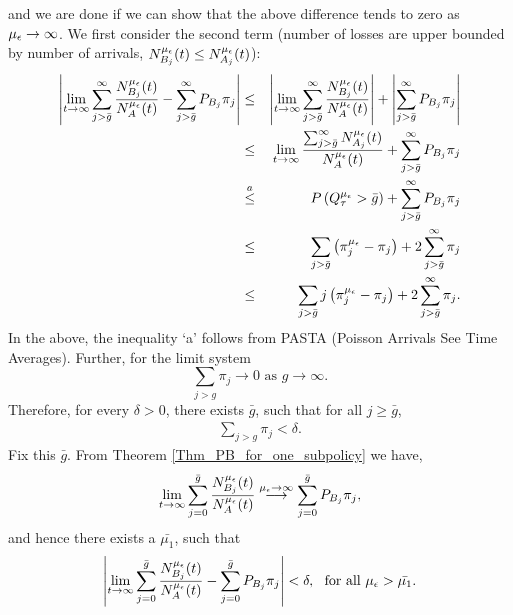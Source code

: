 	and we are done if we can show that the above difference tends to zero as $\mu_{ \epsilon } \to \infty$. We first consider the second term (number of losses are upper bounded by number of arrivals, 
	$N_{B_j}^{\mu_\epsilon} (t) \le N^{\mu_\epsilon}_{A_j}(t)$):
	\begin{eqnarray}
	 \left| \lim\limits_{t \to \infty }  \sum_{j> \bar{g}}^\infty \frac{N_{B_j}^{\mu_\epsilon} (t)}{N_A^{\mu_\epsilon} (t)} - \sum_{j > \bar{g}}^{\infty} P_{B_j} {\pi}_j  \right|
	&\leq&   \left| \lim\limits_{t \to \infty }  \sum_{j> \bar{g}}^\infty  \frac{N_{B_j}^{\mu_\epsilon} (t)}{N_A^{\mu_\epsilon} (t)}  \right| + \left| \sum_{j > \bar{g}}^{\infty} P_{B_j} {\pi}_j  \right| \nonumber \\
	&\leq&   \lim\limits_{t \to \infty }    \frac{\sum_{j> \bar{g}}^\infty N_{A_j}^{\mu_\epsilon} (t)}{N_A^{\mu_\epsilon} (t)}  + \sum_{j > \bar{g}}^{\infty} P_{B_j} {\pi}_j  \nonumber \\
	&\stackrel{a}{\leq}&   P \left( Q_{\tau}^{\mu_\epsilon} > \bar{g}\right) +  \sum_{j > \bar{g}}^{\infty} P_{B_j} {\pi}_j   \nonumber \nonumber\\
	&\leq&    \sum_{j  > \bar{g} } \left( {\pi}^{\mu_\epsilon}_j -  {\pi}_j  \right) + 2 \sum_{j > \bar{g}}^{\infty}  {\pi}_j  \nonumber \\
	&\leq&    \sum_{j  > \bar{g} } j \left( {\pi}^{\mu_\epsilon}_j -  {\pi}_j  \right) + 2 \sum_{j > \bar{g}}^{\infty}  {\pi}_j.  \label{Eqn_Final_difference_eager}
	\end{eqnarray} In the above, the inequality `a'  follows from PASTA (Poisson Arrivals See Time Averages). Further, for the limit system
	$$
	\sum_{j > g}  {\pi}_j   \to 0 \mbox{ as } g \to \infty .
	$$
	Therefore, for every $\delta >0$, there exists $\bar{g}$, such that for all $j \geq \bar{g}$,
	\begin{eqnarray}
	\label{Eqn_Pi_Sum_Bound}
	\sum_{j > g}  {\pi}_j   < \delta.
	\end{eqnarray}
	Fix this ${\bar g}$.  From Theorem \ref{Thm_PB_for_one_subpolicy}  we have, 
	$$
	\lim\limits_{t \to \infty }  \sum_{j=0}^{\bar{g}} \frac{N_{B_j}^{\mu_\epsilon} (t)}{N_A^{\mu_\epsilon} (t)} \stackrel{{\mu_\epsilon} \to \infty}{\longrightarrow} \sum_{j = 0}^{{\bar{g}}} P_{B_j} {\pi}_j,
	$$ 
	and hence   there exists a $\bar{\mu_1}$, such that 
	\begin{eqnarray}
	\label{Eqn_Finite_Sum_Bound}
	\left| \lim\limits_{t \to \infty }  \sum_{j=0}^{\bar{g}} \frac{N_{B_j}^{\mu_\epsilon} (t)}{N_A^{\mu_\epsilon} (t)} - \sum_{j = 0}^{{\bar{g}}} P_{B_j} {\pi}_j \right| < \delta, \ \ \mbox{for all ${\mu_\epsilon} > \bar{\mu_1}$}.
	\end{eqnarray}
